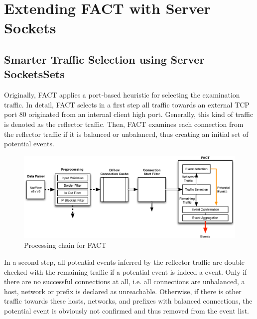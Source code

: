 \chapter{Extending FACT with Server Sockets\label{chapter:integration}}

\section{Smarter Traffic Selection using Server SocketsSets 
\label{section:ses_traffic_selection}}

Originally, \gls{FACT} applies a port-based heuristic for selecting the 
examination traffic. 
In detail, \gls{FACT} selects in a first step all traffic towards an external 
\gls{TCP} port 80 originated from an internal client high port. 
Generally, this kind of traffic is denoted as the reflector traffic. 
Then, \gls{FACT} examines each connection from the reflector traffic if it is 
balanced or unbalanced, thus creating an initial set of potential events. 

\begin{figure}
	[!b] \centering
	\includegraphics[width=\linewidth]{images/FACT.eps}
	\caption{Processing chain for FACT} 
	\label{fig:fact_chain} 
\end{figure}

In a second step, all potential events inferred by the reflector traffic are 
double-checked with the remaining traffic if a potential event is indeed a 
event. Only if there are no successful connections at all, i.e. all connections 
are unbalanced, a host, network or prefix is declared as unreachable. Otherwise, 
if there is other traffic towards these hosts, networks, and prefixes with 
balanced connections, the potential event is obviously not confirmed and thus 
removed from the event list. 

